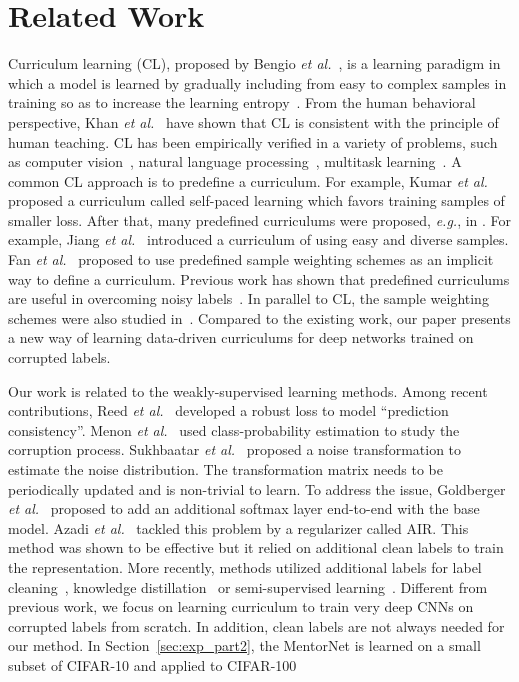 \documentclass{article}
\newcommand{\eg}{\emph{e.g.}} \newcommand{\Eg}{\emph{E.g}}
\newcommand{\etal}{\emph{et al.}}
\begin{document}
\section{Related Work}
\vspace{-1mm}
Curriculum learning (CL), proposed by Bengio \etal~, is a learning paradigm in which a model is learned by gradually including from easy to complex samples in training so as to increase the learning entropy~\cite{bengio2009curriculum}. From the human behavioral perspective, Khan \etal~ have shown that CL is consistent with the principle of human teaching. CL has been empirically verified in a variety of problems, such as computer vision~\cite{supancic2013self,chen2015webly}, natural language processing~\cite{turian2010word}, multitask learning~\cite{graves2017automated}. A common CL approach is to predefine a curriculum. For example, Kumar \etal~ proposed a curriculum called self-paced learning which favors training samples of smaller loss. After that, many predefined curriculums were proposed, \eg, in \cite{supancic2013self,jiang2014self,jiang2015self,sangineto2016self,chang2017active,ma2017self,ma2017convergence}. For example, Jiang \etal~ introduced a curriculum of using easy and diverse samples. Fan \etal~ proposed to use predefined sample weighting schemes as an implicit way to define a curriculum. Previous work has shown that predefined curriculums are useful in overcoming noisy labels~\cite{chen2015webly,liang2016learning,lin2017active}. In parallel to CL, the sample weighting schemes were also studied in~\cite{lin2017active,wang2017robust,fan2018learning,dehghani2018fidelityweighted}. Compared to the existing work, our paper presents a new way of learning data-driven curriculums for deep networks trained on corrupted labels.




Our work is related to the weakly-supervised learning methods. Among recent contributions, Reed \etal~ developed a robust loss to model ``prediction consistency''. Menon \etal~ used class-probability estimation to study the corruption process. Sukhbaatar \etal~ proposed a noise transformation to estimate the noise distribution. The transformation matrix needs to be periodically updated and is non-trivial to learn. To address the issue, Goldberger \etal~ proposed to add an additional softmax layer end-to-end with the base model. Azadi \etal~ tackled this problem by a regularizer called AIR. This method was shown to be effective but it relied on additional clean labels to train the representation.
More recently, methods utilized additional labels for label cleaning~\cite{Veit2017}, knowledge distillation~\cite{Li2017ICCV} or semi-supervised learning~\cite{vahdat2017toward,dehghani2017avoiding}. Different from previous work, we focus on learning curriculum to train very deep CNNs on corrupted labels from scratch. In addition, clean labels are not always needed for our method. In Section~\ref{sec:exp_part2}, the MentorNet is learned on a small subset of CIFAR-10 and applied to CIFAR-100
\end{document}
